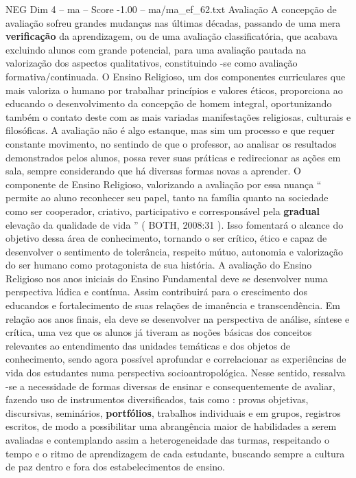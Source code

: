 \begin{textsample}{NEG Dim 4 – ma – Score -1.00 – ma/ma\_ef\_62.txt}  \label{ex:f4_neg_240}
Avaliação A concepção de avaliação sofreu grandes mudanças nas últimas décadas, passando de uma mera \textbf{verificação} da aprendizagem, ou de uma avaliação classificatória, que acabava excluindo alunos com grande potencial, para uma avaliação pautada na valorização dos aspectos qualitativos, constituindo -se como avaliação formativa/continuada.
O Ensino Religioso, um dos componentes curriculares que mais valoriza o humano por trabalhar princípios e valores éticos, proporciona ao educando o desenvolvimento da concepção de homem integral, oportunizando também o contato deste com as mais variadas manifestações religiosas, culturais e filosóficas.
A avaliação não é algo estanque, mas sim um processo e que requer constante movimento, no sentindo de que o professor, ao analisar os resultados demonstrados pelos alunos, possa rever suas práticas e redirecionar as ações em sala, sempre considerando que há diversas formas novas a aprender.
O componente de Ensino Religioso, valorizando a avaliação por essa nuança “ permite ao aluno reconhecer seu papel, tanto na família quanto na sociedade como ser cooperador, criativo, participativo e corresponsável pela \textbf{gradual} elevação da qualidade de vida ” ( BOTH, 2008:31 ).
Isso fomentará o alcance do objetivo dessa área de conhecimento, tornando o ser crítico, ético e capaz de desenvolver o sentimento de tolerância, respeito mútuo, autonomia e valorização do ser humano como protagonista de sua história.
A avaliação do Ensino Religioso nos anos iniciais do Ensino Fundamental deve se desenvolver numa perspectiva lúdica e contínua.
Assim contribuirá para o crescimento dos educandos e fortalecimento de suas relações de imanência e transcendência.
Em relação aos anos finais, ela deve se desenvolver na perspectiva de análise, síntese e crítica, uma vez que os alunos já tiveram as noções básicas dos conceitos relevantes ao entendimento das unidades temáticas e dos objetos de conhecimento, sendo agora possível aprofundar e correlacionar as experiências de vida dos estudantes numa perspectiva socioantropológica.
Nesse sentido, ressalva -se a necessidade de formas diversas de ensinar e consequentemente de avaliar, fazendo uso de instrumentos diversificados, tais como : provas objetivas, discursivas, seminários, \textbf{portfólios}, trabalhos individuais e em grupos, registros escritos, de modo a possibilitar uma abrangência maior de habilidades a serem avaliadas e contemplando assim a heterogeneidade das turmas, respeitando o tempo e o ritmo de aprendizagem de cada estudante, buscando sempre a cultura de paz dentro e fora dos estabelecimentos de ensino.

\end{textsample}
